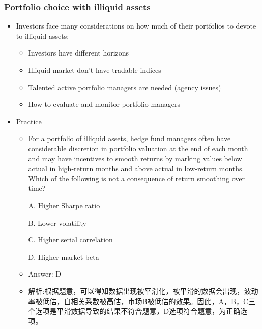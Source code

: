 \subsubsection{Portfolio choice with illiquid assets}
\begin{itemize}
\item Investors face many considerations on how much of their portfolios to devote to illiquid assets:
    \begin{itemize}
    \item Investors have different horizons
    \item Illiquid market don't have tradable indices
    \item Talented active portfolio managers are needed (agency issues)
    \item How to evaluate and monitor portfolio managers
    \end{itemize}
\item Practice
    \begin{itemize}
    \item For a portfolio of illiquid assets, hedge fund managers often have considerable discretion in portfolio valuation at the end of each month and may have incentives to smooth returns by marking values below actual in high-return months and above actual in low-return months. Which of the following is not a consequence of return smoothing over time?
    
    A. Higher Sharpe ratio

    B. Lower volatility

    C. Higher serial correlation

    D. Higher market beta
    \item Answer: D
    \item 解析:根据题意，可以得知数据出现被平滑化，被平滑的数据会出现，波动率被低估，自相关系数被高估，市场B被低估的效果。因此，A，B，C三个选项是平滑数据导致的结果不符合题意，D选项符合题意，为正确选项。
    \end{itemize}
    
\end{itemize}



